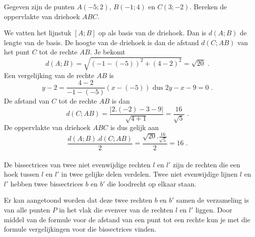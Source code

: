 \begin{voorbeeld}
	Gegeven zijn de punten $A(-5;2)$, $B(-1;4)$ en $C(3;-2)$.
Bereken de oppervlakte van driehoek $ABC$.

\begin{center}
	
\end{center}



We vatten het lijnstuk $[A;B]$ op als basis van de driehoek.
Dan is $d(A;B)$ de lengte van de basis.
De hoogte van de driehoek is dan de afstand $d(C;AB)$ van het punt $C$ tot de rechte $AB$.
Je bekomt
\[
d(A;B)=\sqrt { (-1-(-5))^2+(4-2)^2}=\sqrt {20} \text { .}
\]
Een vergelijking van de rechte $AB$ is
\[
y-2=\frac {4-2}{-1-(-5)}(x-(-5)) \text { dus } 2y-x-9=0 \text { .}
\]
De afstand van $C$ tot de rechte $AB$ is dan
\[
d(C;AB)=\frac {\vert 2.(-2)-3-9 \vert}{\sqrt{4+1}}=\frac {16}{\sqrt {5}} \text { .}
\]
De oppervlakte van driehoek $ABC$ is dus gelijk aan
\[
\frac {d(A;B).d(C;AB)}{2}=\frac { \sqrt {20}.\frac {16}{\sqrt {5}}}{2}=16 \text { .}
\]\\

De bissectrices van twee niet evenwijdige rechten $l$ en $l'$ zijn de rechten die een hoek tussen $l$ en $l'$ in twee gelijke delen verdelen.
Twee niet evenwijdige lijnen $l$ en $l'$ hebben twee bissectrices $b$ en $b'$ die loodrecht op elkaar staan.

\begin{center}
	
\end{center}




Er kan aangetoond worden dat deze twee rechten $b$ en $b'$ samen de verzameling is van alle punten $P$ in het vlak die evenver van de rechten $l$ en $l'$ liggen.
Door middel van de formule voor de afstand van een punt tot een rechte kun je met die formule vergelijkingen voor die bissectrices vinden.\\
\end{voorbeeld}

